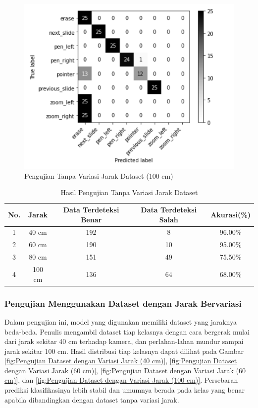 \hfill \break
\hfill \break

\begin{figure}[!htb]
  \centering
  \includegraphics[scale=0.8]{gambar/pengujian-jarak/homogen-dataset/100cm.png}
  \caption{Pengujian Tanpa Variasi Jarak Dataset (100 cm)}
  \label{fig:Pengujian Tanpa Variasi Jarak Dataset (100 cm)}
\end{figure}

\begin{longtable}{|c|c|c|c|c|}
  \caption{Hasil Pengujian Tanpa Variasi Jarak Dataset}
  \label{tb:Hasil Pengujian Tanpa Variasi Jarak Dataset}\\
  \hline
  \rowcolor[HTML]{FFFFFF}
  \textbf{No.} & \textbf{Jarak} & \textbf{Data Terdeteksi Benar} & \textbf{Data Terdeteksi Salah} & \textbf{Akurasi(\%)} \\
  \hline
  1 & 40 cm  & 192 & 8 & 96.00\%  \\
  2 & 60 cm  & 190 & 10 & 95.00\%  \\
  3 & 80 cm  & 151 & 49 & 75.50\%  \\
  4 & 100 cm & 136 & 64 & 68.00\%  \\
  \hline
\end{longtable}

\subsubsection{Pengujian Menggunakan Dataset dengan Jarak Bervariasi}
\label{subsubsec:Pengujian Menggunakan Dataset dengan Jarak Bervariasi}
Dalam pengujian ini, model yang digunakan memiliki dataset yang jaraknya beda-beda. Penulis mengambil dataset tiap kelasnya dengan cara bergerak mulai dari jarak sekitar 40 cm terhadap kamera, dan perlahan-lahan mundur sampai jarak sekitar 100 cm. Hasil distribusi tiap kelasnya dapat dilihat pada Gambar \ref{fig:Pengujian Dataset dengan Variasi Jarak (40 cm)}, \ref{fig:Pengujian Dataset dengan Variasi Jarak (60 cm)}, \ref{fig:Pengujian Dataset dengan Variasi Jarak (60 cm)}, dan \ref{fig:Pengujian Dataset dengan Variasi Jarak (100 cm)}. Persebaran prediksi klasifikasinya lebih stabil dan umumnya berada pada kelas yang benar apabila dibandingkan dengan dataset tanpa variasi jarak. 

